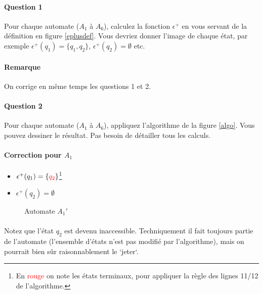 \documentclass{article}[11pt]
\theoremstyle{definition}
\begin{document}
\paragraph*{Question 1} Pour chaque automate ($A_1$ à $A_6$), calculez la fonction $\epsilon^+$ en vous servant de la définition en figure \ref{eplusdef}. Vous devriez donner l'image de chaque état, par exemple $\epsilon^+(q_1) = \{q_1,q_2\}$, $\epsilon^+(q_2) = \emptyset$ etc. 

\paragraph{Remarque} On corrige en même temps les questions 1 et 2.

\paragraph*{Question 2} Pour chaque automate ($A_1$ à $A_6$), appliquez l'algorithme de la figure \ref{algo}. Vous pouvez dessiner le résultat. Pas besoin de détailler tous les calculs. 


\paragraph*{Correction pour $A_1$} 
\begin{itemize}
\item[] $\epsilon^+(q_1) = \{\textcolor{red}{q_2}\}$\footnote{En \textcolor{red}{rouge} on note les états terminaux, pour appliquer la règle des lignes 11/12 de l'algorithme.}
\item[] $\epsilon^+(q_2) = \emptyset$
\end{itemize}


\begin{figure}[!h]
\centering

\caption{Automate $A_1'$}
\end{figure}

\paragraph*{}Notez que l'état $q_2$ est devenu inaccessible. Techniquement il fait toujours partie de l'automate (l'ensemble d'états n'est pas modifié par l'algorithme), mais on pourrait bien sûr raisonnablement le `jeter`.
\end{document}
